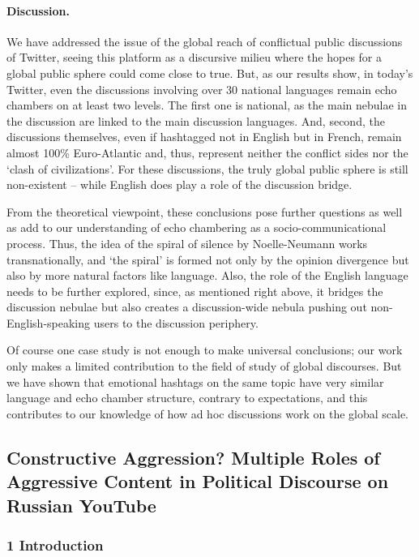 \paragraph{Discussion.} We have addressed the issue of the global reach of conflictual public discussions of Twitter, seeing this platform as a discursive milieu where the hopes for a global public sphere could come close to true. But, as our results show, in today’s Twitter, even the discussions involving over 30 national languages remain echo chambers on at least two levels. The first one is national, as the main nebulae in the discussion are linked to the main discussion languages. And, second, the discussions themselves, even if hashtagged not in English but in French, remain almost 100\% Euro-Atlantic and, thus, represent neither the conflict sides nor the ‘clash of civilizations’. For these discussions, the truly global public sphere is still non-existent -- while English does play a role of the discussion bridge.

From the theoretical viewpoint, these conclusions pose further questions as well as add to our understanding of echo chambering as a socio-communicational process. Thus, the idea of the spiral of silence by Noelle-Neumann \cite{NoelleNeumann} works transnationally, and ‘the spiral’ is formed not only by the opinion divergence but also by more natural factors like language. Also, the role of the English language needs to be further explored, since, as mentioned right above, it bridges the discussion nebulae but also creates a discussion-wide nebula pushing out non-English-speaking users to the discussion periphery.

Of course one case study is not enough to make universal conclusions; our work only makes a limited contribution to the field of study of global discourses. But we have shown that emotional hashtags on the same topic have very similar language and echo chamber structure, contrary to expectations, and this contributes to our knowledge of how ad hoc discussions work on the global scale.

\subsection{Constructive Aggression? Multiple Roles of Aggressive Content in Political Discourse on Russian YouTube}\label{subsec:ch5/sec3/sub5}

\subsubsection{1 Introduction}

